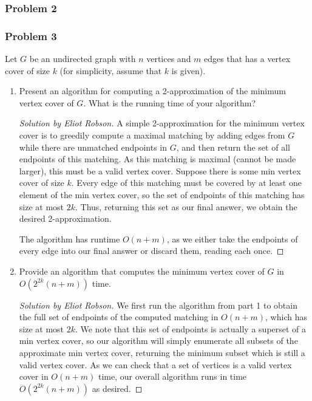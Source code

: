 \documentclass{article}
\newenvironment{solution}[1]{\begin{proof}[Solution by #1]}{\end{proof}}
\begin{document}
\subsubsection{Problem 2}

\subsubsection{Problem 3}
Let \(G\) be an undirected graph with \(n\) vertices and \(m\) edges that has a vertex cover of size \(k\) (for simplicity, assume that \(k\) is given).

\begin{enumerate}
    \item Present an algorithm for computing a 2-approximation of the minimum vertex cover of \(G\). What is the running time of your algorithm?
    
    \begin{solution}{Eliot Robson}
        A simple 2-approximation for the minimum vertex cover is to greedily compute a maximal matching by adding edges from \(G\) while there are unmatched endpoints in \(G\), and then return the set of all endpoints of this matching. As this matching is maximal (cannot be made larger), this must be a valid vertex cover. Suppose there is some min vertex cover of size \(k\). Every edge of this matching must be covered by at least one element of the min vertex cover, so the set of endpoints of this matching has size at most \(2k\). Thus, returning this set as our final answer, we obtain the desired 2-approximation.
        
        The algorithm has runtime \(O(n + m)\), as we either take the endpoints of every edge into our final answer or discard them, reading each once. 
    \end{solution}

    \item Provide an algorithm that computes the minimum vertex cover of \(G\) in \(O(2^{2k} (n+m))\) time.
    
    \begin{solution}{Eliot Robson}
        We first run the algorithm from part 1 to obtain the full set of endpoints of the computed matching in \(O(n + m)\), which has size at most \(2k\). We note that this set of endpoints is actually a superset of a min vertex cover, so our algorithm will simply enumerate all subsets of the approximate min vertex cover, returning the minimum subset which is still a valid vertex cover. As we can check that a set of vertices is a valid vertex cover in \(O(n + m)\) time, our overall algorithm runs in time \(O(2^{2k} (n + m))\) as desired.
    \end{solution}


\end{enumerate}
\end{document}
